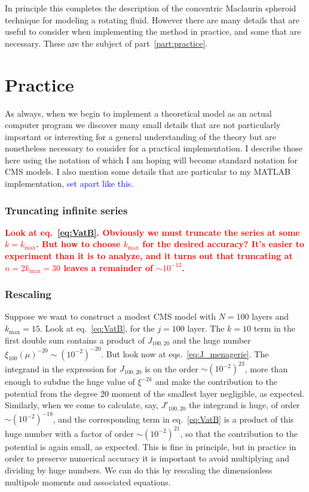 \documentclass[amsmath,amsfonts,rmp,letterpaper]{revtex4}
\newcommand{\sub}[1]{_{\text{#1}}} %
\newcommand{\about}{\sim\!}
\newcommand{\red}[1]{\textbf{\textcolor{red}{#1}}}
\newcommand{\kmax}{k\sub{max}}
\newcommand{\ML}[1]{{\textcolor{blue}{#1}}}
\begin{document}
In principle this completes the description of the concentric Maclaurin spheroid
technique for modeling a rotating fluid. However there are many details that are
useful to consider when implementing the method in practice, and some that are
necessary. These are the subject of part~\ref{part:practice}.


\section{Practice\label{part:practice}}
As always, when we begin to implement a theoretical model as an actual computer
program we discover many small details that are not particularly important or
interesting for a general understanding of the theory but are nonetheless
necessary to consider for a practical implementation. I describe those here using
the notation of \citet{Hubbard2013} which I am hoping will become standard
notation for CMS models. I also mention some details that are particular to my
MATLAB implementation, \ML{set apart like this.}

\subsubsection{Truncating infinite series}

\red{Look at eq.~\eqref{eq:VatB}. Obviously we must truncate the series at some
$k=\kmax$. But how to choose $\kmax$ for the desired accuracy? It's easier to
experiment than it is to analyze, and it turns out that truncating at
$n=2\kmax=30$ leaves a remainder of $\about{10^{-12}}$.}

\subsubsection{Rescaling}

Suppose we want to construct a modest CMS model with $N=100$ layers and
$\kmax=15$. Look at eq.~\eqref{eq:VatB}, for the $j=100$ layer. The $k=10$ term in
the first double sum contains a product of $J_{100,20}$ and the huge number
$\xi_{100}(\mu)^{-20}\sim(10^{-2})^{-20}$. But look now at
eqs.~\eqref{eq:J_menagerie}. The integrand in the expression for $J_{100,20}$ is
on the order $\about(10^{-2})^{23}$, more than enough to subdue the huge value of
$\xi^{-2k}$ and make the contribution to the potential from the degree 20 moment
of the smallest layer negligible, as expected. Similarly, when we come to
calculate, say, $J'_{100,20}$ the integrand is huge, of order
$\about{}(10^{-2})^{-18}$, and the corresponding term in eq.~\eqref{eq:VatB}
is a product of this huge number with a factor of order $\about{}(10^{-2})^{21}$,
so that the contribution to the potential is again small, as expected. This is
fine in principle, but in practice in order to preserve numerical accuracy it is
important to avoid multiplying and dividing by huge numbers. We can do this by
rescaling the dimensionless multipole moments and associated equations.
\end{document}
